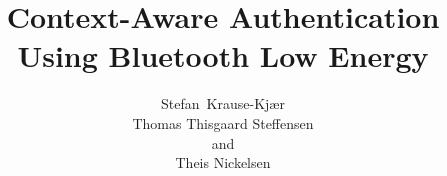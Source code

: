 \documentclass[a4paper,oneside,11pt]{memoir}
\begin{document}
\title{Context-Aware Authentication \\ Using Bluetooth Low Energy}

\author{Stefan~Krause-Kj\ae r\\
        Thomas Thisgaard Steffensen\\
        and \\
        Theis Nickelsen%
}

\newcommand{\buildBoxPlot}[5]{
	\addplot+[
	blue,
    solid,
	boxplot prepared={
		median= #1,
		upper quartile=#2,
		lower quartile=#3,
		upper whisker=#4,
		lower whisker=#5
	},
	] coordinates {};
	
}

\maketitle
\clearpage


\clearpage

\tableofcontents
\clearpage














%
\end{document}
